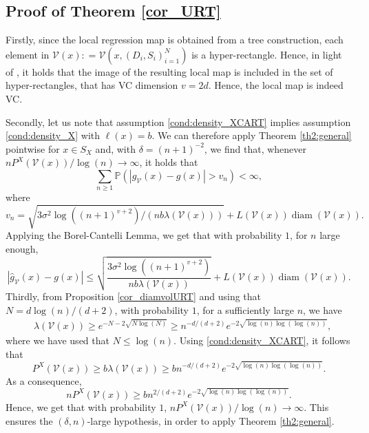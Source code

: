 \documentclass[paper=a4, fontsize=11pt]{scrartcl}
\newcommand{\diam}{\operatorname{diam}}
\begin{document}
\subsection*{Proof of Theorem \ref{cor_URT}}

Firstly, since the local regression map is obtained from a tree construction, each element in $\mathcal V ( x) : = \mathcal V ( x, (D_i,S_i)_{i=1}^N )$ is a hyper-rectangle. Hence, in light of \cite{wenocur1981some}, it holds that the image of the resulting local map is included in the set of hyper-rectangles, that has VC dimension $v = 2d$. Hence, the local map is indeed VC. 

Secondly, let us note that assumption \ref{cond:density_XCART} implies assumption \ref{cond:density_X} with $\ell(x) = b$. We can therefore apply Theorem \ref{th2:general} pointwise for $x \in S_X$ and, with $\delta = (n+1)^{-2}$, we find that, whenever $n P^X (\mathcal{V}(x) ) / \log(n) \to \infty$, it holds that
$$ \sum_{n\geq 1} \mathbb P ( |\hat g_{\mathcal V}(x) - g(x)| > v_n ) < \infty,$$
where $$v_n = \sqrt{ 3 \sigma^2 \log( {(n+1)^{v+2}}  ) / (n  b \lambda ( \mathcal V(x)) )}  + L(\mathcal V(x)) \diam (\mathcal V(x)).$$
Applying the Borel-Cantelli Lemma, we get that with probability $1$, for $n$ large enough,
$$|\hat g_{\mathcal V}(x) - g(x)| \leq  \sqrt{\frac{ 3 \sigma^2 \log\left( {(n+1)^{v+2}} \right)}{n  b \lambda ( \mathcal V(x)) }} + L(\mathcal V(x)) \diam (\mathcal V(x)).$$
Thirdly, from Proposition \ref{cor_diamvolURT} and using that $ N = d\log(n)/(d+2)$, with probability $1$, for a sufficiently large \(n\), we have
\begin{align*}
& \lambda(\mathcal{V}(x)) \geq e^{-N - 2 \sqrt{N \log(N)}} \geq n^{-d/(d+2)} e^{- 2 \sqrt{\log(n) \log(\log(n)) }  },
\end{align*}
where we have used that \(N \leq \log(n)\). Using \ref{cond:density_XCART}, it follows that
$$ P^X (\mathcal{V}(x) ) \geq b \lambda(\mathcal{V}(x))  \geq b n^{-d/(d+2)} e^{- 2 \sqrt{\log(n) \log(\log(n)) }  }.$$
As a consequence,
$$ n P^X (\mathcal{V}(x) ) \geq b n ^{ 2 /(d+2) } e^{- 2 \sqrt{\log(n) \log(\log(n)) }  }.$$
Hence, we get that with probability $1$, $ n P^X (\mathcal{V}(x) ) / \log(n) \to \infty$. This ensures the $(\delta, n)$-large hypothesis, in order to apply Theorem \ref{th2:general}.
\end{document}

